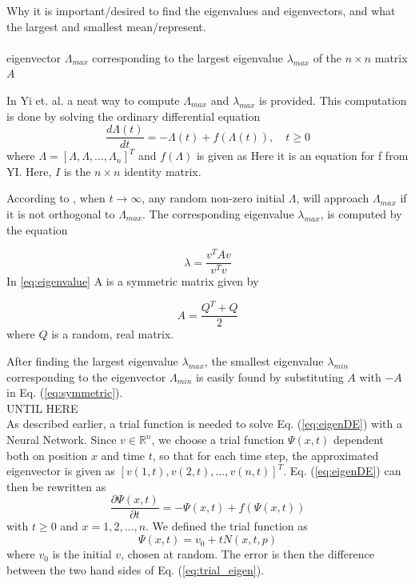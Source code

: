 \documentclass[a4paper,11pt,twocolumn]{article}
\begin{document}
Why it is important/desired to find the eigenvalues and eigenvectors, and what the largest and smallest mean/represent. 
\\
\\
eigenvector $\Lambda_{max}$ corresponding to the largest eigenvalue $\lambda_{max}$ of the $n\times n$ matrix $A$ 

In Yi et. al. \cite{yi} a neat way to compute $\Lambda_{max}$ and $\lambda_{max}$ is provided. This computation is done by solving the ordinary differential equation
\begin{equation}
	\frac{d\Lambda(t)}{dt} = -\Lambda(t) + f(\Lambda(t)), \quad t\geq 0
	\label{eq:eigen2}
\end{equation}
 where $\Lambda = [\Lambda,\Lambda,\ldots,\Lambda_n]^T$ and $f(\Lambda)$ is given as
Here it is an equation for f from YI.
Here, $I$ is the $n\times n$ identity matrix. 

According to \cite{yi}, when $t\rightarrow \infty$, any random non-zero initial $\Lambda$, will approach $\Lambda_{max}$ if it is not orthogonal to $\Lambda_{max}$. The corresponding eigenvalue $\lambda_{max}$, is computed by the equation 

\begin{equation}
	\lambda = \frac{v^TAv}{v^Tv}
	\label{eq:eigenvalue}
\end{equation}
In \eqref{eq:eigenvalue} A is a symmetric matrix given by

\begin{equation}
	A = \frac{Q^T+Q }{2}
	\label{eq:symmetric}
\end{equation}
where $Q$ is a random, real matrix. 

After finding the largest eigenvalue $\lambda_{max}$, the smallest eigenvalue $\lambda_{min}$ corresponding to the eigenvector $\Lambda_{min}$ is easily found by substituting $A$ with $-A$ in Eq. (\ref{eq:symmetric})\cite{yi}.
\\
UNTIL HERE 
\\

As described earlier, a trial function is needed to solve Eq. (\ref{eq:eigenDE}) with a Neural Network. Since $v \in \mathbb{R}^n$, we choose a trial function $\Psi(x,t)$ dependent both on position $x$ and time $t$, so that for each time step, the approximated eigenvector is given as $[v(1,t), v(2,t), \ldots, v(n,t)]^T$. Eq. (\ref{eq:eigenDE}) can then be rewritten as
\begin{equation}\label{eq:trial_eigen}
	\frac{\partial \Psi(x,t)}{\partial t} = -\Psi(x,t) + f(\Psi(x,t))
\end{equation}
with $t \geq 0$ and $x=1,2,\ldots,n$. We defined the trial function as 
\begin{equation*}
	 \Psi(x,t) = v_0 + tN(x,t,p)
\end{equation*}
where $v_0$ is the initial $v$, chosen at random.   
The error is then the difference between the two hand sides of Eq. (\ref{eq:trial_eigen}). 
\end{document}
